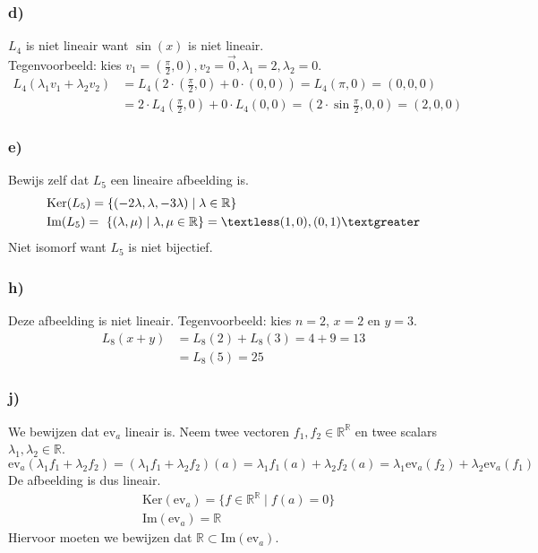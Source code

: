 \documentclass[lineaire_algebra_oplossingen.tex]{subfiles}
\begin{document}
\subsubsection*{d)}
$L_4$ is niet lineair want $\sin(x)$ is niet lineair.\\
Tegenvoorbeeld: kies $v_1=(\frac{\pi}{2},0),v_2=\vec{0},\lambda_1 = 2,\lambda_2=0$.
\begin{align*}
L_4(\lambda_1v_1+\lambda_2v_2)
&= L_4\left(2\cdot\left(\frac{\pi}{2},0\right) + 0\cdot(0,0)\right) = L_4(\pi,0)=(0,0,0) \\
&= 2\cdot L_4\left(\frac{\pi}{2},0\right)+0\cdot L_4(0,0) = \left(2\cdot \sin\frac{\pi}{2},0,0\right)=(2,0,0)
\end{align*}

\subsubsection*{e)}
Bewijs zelf dat $L_5$ een lineaire afbeelding is.
\begin{align*}
& \text{Ker}(L_5)= \{(-2\lambda ,\lambda ,-3\lambda)\mid\lambda \in \mathbb{R} \} \\
& \text{Im}(L_5)= \ \{(\lambda,\mu) \mid \lambda,\mu \in \mathbb{R} \} = \textless(1,0),(0,1)\textgreater
\end{align*}
Niet isomorf want $L_5$ is niet bijectief.

\subsubsection*{h)}
Deze afbeelding is niet lineair. Tegenvoorbeeld: kies $n=2$, $x=2$ en $y=3$.
\begin{align*}
L_8(x+y)
&= L_8(2) + L_8(3) = 4 + 9 = 13 \\
&= L_8(5) = 25
\end{align*}

\subsubsection*{j)}
We bewijzen dat $\text{ev}_a$ lineair is. Neem twee vectoren $f_1,f_2 \in \mathbb{R}^{\mathbb{R}}$ en twee scalars $\lambda_1, \lambda_2 \in \mathbb{R}$.
\[
\text{ev}_a(\lambda_1f_1 + \lambda_2f_2) = (\lambda_1f_1 + \lambda_2f_2)(a) = \lambda_1f_1(a) + \lambda_2f_2(a) = \lambda_1\text{ev}_a(f_2) + \lambda_2\text{ev}_a(f_1)
\]
De afbeelding is dus lineair.
\begin{align*}
& \text{Ker}(\text{ev}_a) = \{ f \in \mathbb{R}^{\mathbb{R}} \mid f(a) = 0\} \\
& \text{Im}(\text{ev}_a) = \mathbb{R}
\end{align*}
Hiervoor moeten we bewijzen dat $\mathbb{R} \subset \text{Im}(\text{ev}_a)$.
\end{document}

